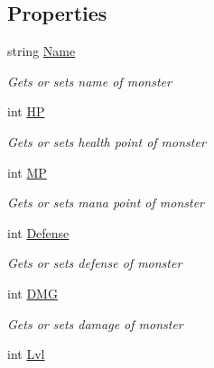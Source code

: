 \subsection*{Properties}
\begin{DoxyCompactItemize}
\item 
string \hyperlink{class_lightdeath_1_1_monsters_a2503ac1a54faf2c40396a13fddcc44a4}{Name}
\begin{DoxyCompactList}\small\item\em Gets or sets name of monster \end{DoxyCompactList}\item 
int \hyperlink{class_lightdeath_1_1_monsters_a53eb57a1d9229f840ed8dbd183b50aa2}{HP}
\begin{DoxyCompactList}\small\item\em Gets or sets health point of monster \end{DoxyCompactList}\item 
int \hyperlink{class_lightdeath_1_1_monsters_ac60cf6c7ed8b55997d0787d68c95fa78}{MP}
\begin{DoxyCompactList}\small\item\em Gets or sets mana point of monster \end{DoxyCompactList}\item 
int \hyperlink{class_lightdeath_1_1_monsters_a540acb36e25a3138f744ede0c04c0477}{Defense}
\begin{DoxyCompactList}\small\item\em Gets or sets defense of monster \end{DoxyCompactList}\item 
int \hyperlink{class_lightdeath_1_1_monsters_ad12fcf0a30214864c743bb5d3f4e4a4a}{D\+MG}
\begin{DoxyCompactList}\small\item\em Gets or sets damage of monster \end{DoxyCompactList}\item 
int \hyperlink{class_lightdeath_1_1_monsters_abc3b7a6488b8bffbcfc32e0e0f1cc65a}{Lvl}

\end{DoxyCompactItemize}
